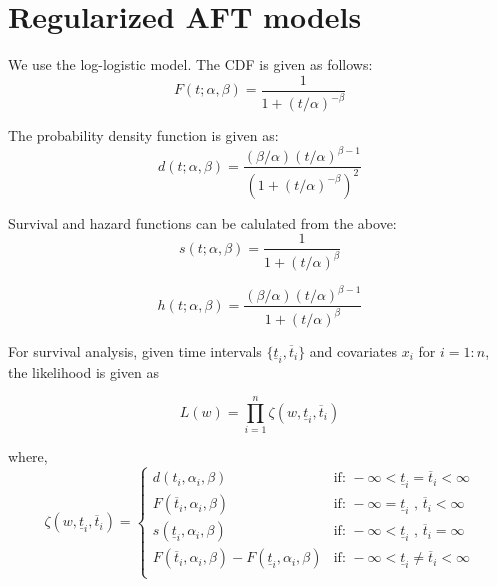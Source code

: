 \documentclass[12pt,a4paper]{report}
\begin{document}
\section{Regularized AFT models}

We use the log-logistic model. The CDF is given as follows:
\begin{equation} \label{cdf}
F(t;\alpha, \beta) = \frac{1}{1+(t/\alpha)^{-\beta}}
\end{equation}

The probability density function is given as:
\begin{equation} \label{pdf}
d(t;\alpha, \beta) = \frac{(\beta / \alpha)(t/{\alpha})^{\beta -1 }}{(1+(t/\alpha)^{-\beta})^2}
\end{equation}

Survival and hazard functions can be calulated from the above:
\begin{equation} \label{survival}
s(t;\alpha, \beta) = \frac{1}{1+(t/\alpha)^{\beta}}
\end{equation}

\begin{equation} \label{hazard}
h(t;\alpha, \beta) = \frac{ (\beta/\alpha) (t/\alpha) ^ {\beta-1}}
						  {1+(t/\alpha)^{\beta}}
\end{equation}


For survival analysis, given time intervals $\{\underline t_i, \overline t_i\}$ and covariates $x_i$ for $i=1:n$,
the likelihood is given as

\begin{equation}
L(w) = \prod_{i=1}^n \zeta(w, \underline t_i, \overline t_i)
\end{equation}

where,
\begin{equation} \label{zeta}
\zeta(w, \underline t_i, \overline t_i) = \begin{cases}
													   d(t_i, \alpha_i, \beta) & \mbox{if: } -\infty < \underline t_i = \overline t_i<\infty \\
													   F(\overline t_i, \alpha_i, \beta) & \mbox{if: } -\infty = \underline t_i \mbox{ , } \overline t_i<\infty \\
													   s(\underline t_i, \alpha_i, \beta) & \mbox{if: } -\infty < \underline t_i \mbox{ , }\overline t_i=\infty \\
													   F(\overline t_i, \alpha_i, \beta) - F(\underline t_i, \alpha_i, \beta) & \mbox{if: } -\infty < \underline t_i \ne \overline t_i<\infty \\
		\end{cases}
\end{equation}
\end{document}
